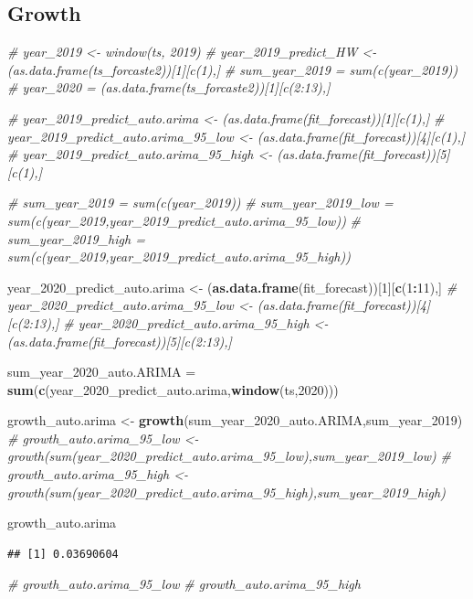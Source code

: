 \documentclass[
]{article}
\newenvironment{Shaded}{\begin{snugshade}}{\end{snugshade}}
\newcommand{\CommentTok}[1]{\textcolor[rgb]{0.56,0.35,0.01}{\textit{#1}}}
\newcommand{\DecValTok}[1]{\textcolor[rgb]{0.00,0.00,0.81}{#1}}
\newcommand{\KeywordTok}[1]{\textcolor[rgb]{0.13,0.29,0.53}{\textbf{#1}}}
\newcommand{\NormalTok}[1]{#1}
\newcommand{\OperatorTok}[1]{\textcolor[rgb]{0.81,0.36,0.00}{\textbf{#1}}}
\newcommand{\StringTok}[1]{\textcolor[rgb]{0.31,0.60,0.02}{#1}}
\begin{document}
\hypertarget{growth-1}{%
\subsection{Growth}\label{growth-1}}

\begin{Shaded}
\begin{Highlighting}[]
\CommentTok{# year_2019 <- window(ts, 2019)}
\CommentTok{# year_2019_predict_HW <- (as.data.frame(ts_forcaste2))[1][c(1),]}
\CommentTok{# sum_year_2019 = sum(c(year_2019))}
\CommentTok{# year_2020 = (as.data.frame(ts_forcaste2))[1][c(2:13),]}


\CommentTok{# year_2019_predict_auto.arima <- (as.data.frame(fit_forecast))[1][c(1),]}
\CommentTok{# year_2019_predict_auto.arima_95_low <- (as.data.frame(fit_forecast))[4][c(1),]}
\CommentTok{# year_2019_predict_auto.arima_95_high <- (as.data.frame(fit_forecast))[5][c(1),]}

\CommentTok{# sum_year_2019 = sum(c(year_2019))}
\CommentTok{# sum_year_2019_low = sum(c(year_2019,year_2019_predict_auto.arima_95_low))}
\CommentTok{# sum_year_2019_high = sum(c(year_2019,year_2019_predict_auto.arima_95_high))}


\NormalTok{year_}\DecValTok{2020}\NormalTok{_predict_auto.arima <-}\StringTok{ }\NormalTok{(}\KeywordTok{as.data.frame}\NormalTok{(fit_forecast))[}\DecValTok{1}\NormalTok{][}\KeywordTok{c}\NormalTok{(}\DecValTok{1}\OperatorTok{:}\DecValTok{11}\NormalTok{),]}
\CommentTok{# year_2020_predict_auto.arima_95_low <- (as.data.frame(fit_forecast))[4][c(2:13),]}
\CommentTok{# year_2020_predict_auto.arima_95_high <- (as.data.frame(fit_forecast))[5][c(2:13),]}

\NormalTok{sum_year_}\DecValTok{2020}\NormalTok{_auto.ARIMA =}\StringTok{ }\KeywordTok{sum}\NormalTok{(}\KeywordTok{c}\NormalTok{(year_}\DecValTok{2020}\NormalTok{_predict_auto.arima,}\KeywordTok{window}\NormalTok{(ts,}\DecValTok{2020}\NormalTok{)))}

\NormalTok{growth_auto.arima <-}\StringTok{ }\KeywordTok{growth}\NormalTok{(sum_year_}\DecValTok{2020}\NormalTok{_auto.ARIMA,sum_year_}\DecValTok{2019}\NormalTok{)}
\CommentTok{# growth_auto.arima_95_low <- growth(sum(year_2020_predict_auto.arima_95_low),sum_year_2019_low)}
\CommentTok{# growth_auto.arima_95_high <- growth(sum(year_2020_predict_auto.arima_95_high),sum_year_2019_high)}

\NormalTok{growth_auto.arima}
\end{Highlighting}
\end{Shaded}

\begin{verbatim}
## [1] 0.03690604
\end{verbatim}

\begin{Shaded}
\begin{Highlighting}[]
\CommentTok{# growth_auto.arima_95_low}
\CommentTok{# growth_auto.arima_95_high}
\end{Highlighting}
\end{Shaded}
\end{document}
